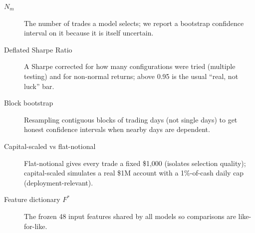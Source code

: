 \documentclass[11pt]{article}
\begin{document}
\begin{description}
\item[$N_m$] The number of trades a model selects; we report a bootstrap confidence interval on it because it is itself uncertain.
\item[Deflated Sharpe Ratio] A Sharpe corrected for how many configurations were tried (multiple testing) and for non-normal returns; above 0.95 is the usual ``real, not luck'' bar.
\item[Block bootstrap] Resampling contiguous blocks of trading days (not single days) to get honest confidence intervals when nearby days are dependent.
\item[Capital-scaled vs flat-notional] Flat-notional gives every trade a fixed \$1,000 (isolates selection quality); capital-scaled simulates a real \$1M account with a 1\%-of-cash daily cap (deployment-relevant).
\item[Feature dictionary $F^{\ast}$] The frozen 48 input features shared by all models so comparisons are like-for-like.
\end{description}
\end{document}
